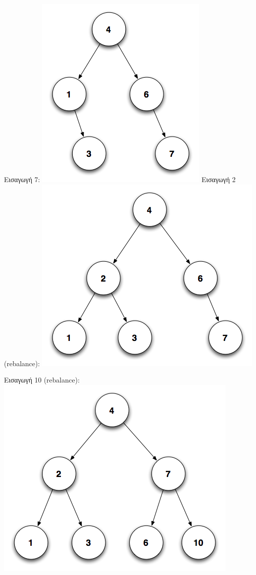 \documentclass[a4paper,10pt]{article}
\begin{document}
Εισαγωγή 7:
\includegraphics[scale=0.3]{files/im4_7.png}
Εισαγωγή 2 (rebalance):
\includegraphics[scale=0.3]{files/im5_2.png}

Εισαγωγή 10 (rebalance):
\includegraphics[scale=0.3]{files/im6_10.png}
\end{document}

